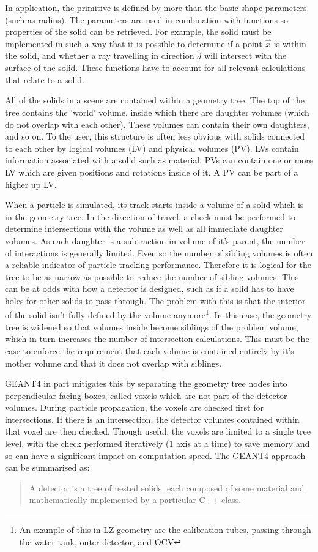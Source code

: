 \par
In application, the primitive is defined by more than the basic shape parameters (such as radius).
The parameters are used in combination with functions so properties of the solid can be retrieved.
For example, the solid must be implemented in such a way that it is possible to determine if a point $\vec{x}$ is within the solid, and whether a ray travelling in direction $\hat{d}$ will intersect with the surface of the solid.
These functions have to account for all relevant calculations that relate to a solid.
\par
All of the solids in a scene are contained within a geometry tree.
The top of the tree contains the 'world' volume, inside which there are daughter volumes (which do not overlap with each other).
These volumes can contain their own daughters, and so on.
To the user, this structure is often less obvious with solids connected to each other by logical volumes (LV) and physical volumes (PV).
LVs contain information associated with a solid such as material. 
PVs can contain one or more LV which are given positions and rotations inside of it. 
A PV can be part of a higher up LV.
\par
When a particle is simulated, its track starts inside a volume of a solid which is in the geometry tree.
In the direction of travel, a check must be performed to determine intersections with the volume as well as all immediate daughter volumes.
As each daughter is a subtraction in volume of it's parent, the number of interactions is generally limited.
Even so the number of sibling volumes is often a reliable indicator of particle tracking performance.
Therefore it is logical for the tree to be as narrow as possible to reduce the number of sibling volumes.
This can be at odds with how a detector is designed, such as if a solid has to have holes for other solids to pass through.
The problem with this is that the interior of the solid isn't fully defined by the volume anymore\footnote{An example of this in LZ geometry are the calibration tubes, passing through the water tank, outer detector, and OCV}.
In this case, the geometry tree is widened so that volumes inside become siblings of the problem volume, which in turn increases the number of intersection calculations.
This must be the case to enforce the requirement that each volume is contained entirely by it's mother volume and that it does not overlap with siblings.
\par
GEANT4 in part mitigates this by separating the geometry tree nodes into perpendicular facing boxes, called voxels \cite{geant4_voxel_ref} which are not part of the detector volumes.
During particle propagation, the voxels are checked first for intersections.
If there is an intersection, the detector volumes contained within that voxel are then checked.
Though useful, the voxels are limited to a single tree level, with the check performed iteratively (1 axis at a time) to save memory and so can have a significant impact on computation speed.
The GEANT4 approach can be summarised as:
\begin{quote}
    A detector is a tree of nested solids, each composed of some material and mathematically implemented by a particular C++ class.
\end{quote}

